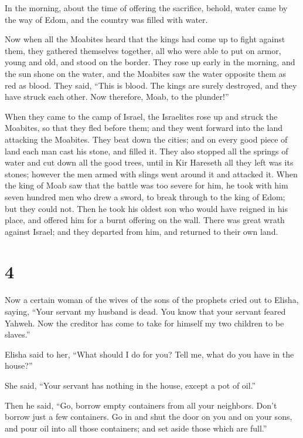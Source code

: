  In the morning, about the time of offering the
sacrifice, behold, water came by the way of Edom, and the country was
filled with water.

 Now when all the Moabites heard that the kings had come
up to fight against them, they gathered themselves together, all who
were able to put on armor, young and old, and stood on the border.
 They rose up early in the morning, and the sun shone on
the water, and the Moabites saw the water opposite them as red as blood.
 They said, ``This is blood. The kings are surely
destroyed, and they have struck each other. Now therefore, Moab, to the
plunder!''

 When they came to the camp of Israel, the Israelites
rose up and struck the Moabites, so that they fled before them; and they
went forward into the land attacking the Moabites.  They
beat down the cities; and on every good piece of land each man cast his
stone, and filled it. They also stopped all the springs of water and cut
down all the good trees, until in Kir Hareseth all they left was its
stones; however the men armed with slings went around it and attacked
it.  When the king of Moab saw that the battle was too
severe for him, he took with him seven hundred men who drew a sword, to
break through to the king of Edom; but they could not. 
Then he took his oldest son who would have reigned in his place, and
offered him for a burnt offering on the wall. There was great wrath
against Israel; and they departed from him, and returned to their own
land.

\hypertarget{section-3}{%
\section{4}\label{section-3}}

 Now a certain woman of the wives of the sons of the
prophets cried out to Elisha, saying, ``Your servant my husband is dead.
You know that your servant feared Yahweh. Now the creditor has come to
take for himself my two children to be slaves.''

 Elisha said to her, ``What should I do for you? Tell me,
what do you have in the house?''

She said, ``Your servant has nothing in the house, except a pot of
oil.''

 Then he said, ``Go, borrow empty containers from all your
neighbors. Don't borrow just a few containers.  Go in and
shut the door on you and on your sons, and pour oil into all those
containers; and set aside those which are full.''

